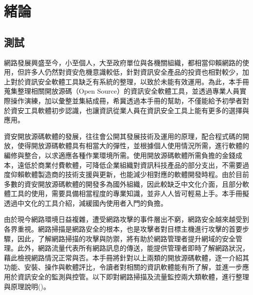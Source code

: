 \renewcommand\thefigure{\arabic{chapter}-\arabic{figure}}
% 

\chapter{緒論}
\label{cha:intro} 

\section{測試}
\label{sec:test1}




網路發展興盛至今，小至個人，大至政府單位與各機關組織，都相當仰賴網路的使用，但許多人仍然對資安危機意識較低，針對資訊安全產品的投資也相對較少，加上對於資訊安全軟體工具缺乏有系統的整理，以致於未能有效運用。為此，本手冊蒐集整理相關開放源碼（Open Source）的資訊安全軟體工具，並透過專業人員實際操作演練，加以彙整並集結成冊，希冀透過本手冊的幫助，不僅能給予初學者對於資安工具軟體初步認識，也讓資訊從業人員在資訊安全工具上能有更多的選擇與應用。

資安開放源碼軟體的發展，往往會公開其發展技術及運用的原理，配合程式碼的開放，使得開放源碼軟體具有相當大的彈性，並根據個人使用情況所需，進行軟體的編修與整合，以求適應各種作業環境所需。使用開放源碼軟體所需負擔的金錢成本，遠低於商業付費軟體，可降低企業組織對資訊科技產品的部分支出，不需要過度仰賴軟體製造商的技術支援與更新，也能減少相對應的軟體開發時程。由於目前多數的資安開放源碼軟體的開發多為國外組織，因此較缺乏中文化介面，且部分軟體工具的使用，需要具備相當程度的專業知識，並非人人皆可輕易上手。本手冊擬透過中文化的工具介紹，減緩國內使用者入門的負擔。

由於現今網路環境日益複雜，遭受網路攻擊的事件層出不窮，網路安全越來越受到各界重視。網路掃描是網路安全的根本，也是攻擊者對目標主機進行攻擊的首要步驟，因此，了解網路掃描的攻擊與防禦，將有助於網路管理者提升網域的安全管理。此外，網路流量代表所有網路訊息的傳送，能提供管理者即時了解網路狀況，藉此檢視網路情況正常與否。本手冊將針對以上兩類的開放源碼軟體，逐一介紹其功能、安裝、操作與軟體評比，令讀者對相關的資訊軟體能有所了解，並進一步應用於資訊安全的監測與控管。以下即對網路掃描及流量監控兩大類軟體，進行整理與原理說明(\cite{test, test1})。
	
